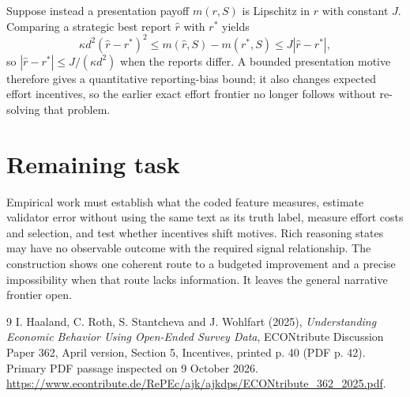\documentclass[11pt]{article}
\begin{document}
Suppose instead a presentation payoff $m(r,S)$ is Lipschitz in $r$ with constant $J$. Comparing a strategic best report $\widehat r$ with $r^*$ yields
\[
 \kappa d^2(\widehat r-r^*)^2
 \leq m(\widehat r,S)-m(r^*,S)
 \leq J|\widehat r-r^*|,
\]
so $|\widehat r-r^*|\leq J/(\kappa d^2)$ when the reports differ. A bounded presentation motive therefore gives a quantitative reporting-bias bound; it also changes expected effort incentives, so the earlier exact effort frontier no longer follows without re-solving that problem.

\section*{Remaining task}
Empirical work must establish what the coded feature measures, estimate validator error without using the same text as its truth label, measure effort costs and selection, and test whether incentives shift motives. Rich reasoning states may have no observable outcome with the required signal relationship. The construction shows one coherent route to a budgeted improvement and a precise impossibility when that route lacks information. It leaves the general narrative frontier open.

\begin{thebibliography}{9}
 I. Haaland, C. Roth, S. Stantcheva and J. Wohlfart (2025), \emph{Understanding Economic Behavior Using Open-Ended Survey Data}, ECONtribute Discussion Paper 362, April version, Section 5, Incentives, printed p. 40 (PDF p. 42). Primary PDF passage inspected on 9 October 2026. \url{https://www.econtribute.de/RePEc/ajk/ajkdps/ECONtribute_362_2025.pdf}.
\end{thebibliography}
\end{document}
